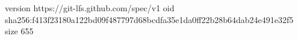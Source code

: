 version https://git-lfs.github.com/spec/v1
oid sha256:f413f23180a122bd09f487797d68bcdfa35e1da0ff22b28b64dab24e491e32f5
size 655
